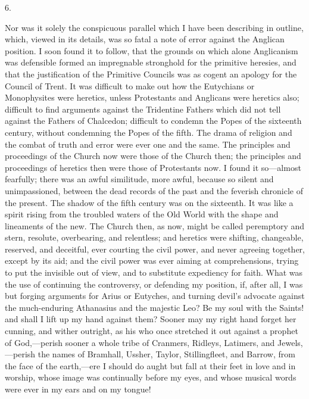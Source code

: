 6.

Nor was it solely the conspicuous parallel which I have been
describing in outline, which, viewed in its details, was so fatal a
note of error against the Anglican position. I soon found it to
follow, that the grounds on which alone Anglicanism was defensible
formed an impregnable stronghold for the primitive heresies, and that
the justification of the Primitive Councils was as cogent an apology
for the Council of Trent. It was difficult to make out how the
Eutychians or Monophysites were heretics, unless Protestants and
Anglicans were heretics also; difficult to find arguments against the
Tridentine Fathers which did not tell against the Fathers of Chalcedon;
difficult to condemn the Popes of the sixteenth century, without
condemning the Popes of the fifth. The drama of religion and the
combat of truth and error were ever one and the same. The principles
and proceedings of the Church now were those of the Church then; the
principles and proceedings of heretics then were those of Protestants
now. I found it so—almost fearfully; there was an awful similitude,
more awful, because so silent and unimpassioned, between the dead
records of the past and the feverish chronicle of the present. The
shadow of the fifth century was on the sixteenth. It was like a spirit
rising from the troubled waters of the Old World with the shape and
lineaments of the new. The Church then, as now, might be called
peremptory and stern, resolute, overbearing, and relentless; and
heretics were shifting, changeable, reserved, and deceitful, ever
courting the civil power, and never agreeing together, except by its
aid; and the civil power was ever aiming at comprehensions, trying to
put the invisible out of view, and to substitute expediency for faith.
What was the use of continuing the controversy, or defending my
position, if, after all, I was but forging arguments for Arius or
Eutyches, and turning devil's advocate against the much-enduring
Athanasius and the majestic Leo? Be my soul with the Saints! and shall
I lift up my hand against them? Sooner may my right hand forget her
cunning, and wither outright, as his who once stretched it out against
a prophet of God,—perish sooner a whole tribe of Cranmers, Ridleys,
Latimers, and Jewels,—perish the names of Bramhall, Ussher, Taylor,
Stillingfleet, and Barrow, from the face of the earth,—ere I should
do aught but fall at their feet in love and in worship, whose image
was continually before my eyes, and whose musical words were ever in
my ears and on my tongue!

